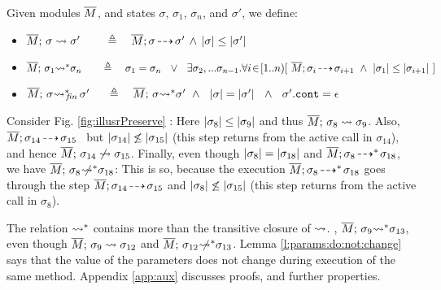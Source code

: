  
 \renewcommand{\EarlierS}[2]{\DepthSt{#1} \leq \DepthSt{#2}}
 \renewcommand{\NotEarlierS}[2]{\DepthSt{#1} \not\leq \DepthSt{#2}} 
 
\begin{definition} Given modules $\overline{M}$, and states $\sigma$, $\sigma_1$, $\sigma_n$, and $\sigma'$, we define:
\label{def:shallow:term}
 
\begin{itemize}

  \item
{  $\leadstoBounded  {\Mtwo} {\sigma}   {\sigma'} \ \ \   \,   \ \ \ \triangleq \ \ \  \leadstoOrig {\Mtwo} {\sigma} {\sigma'} \, \wedge\, 
 \EarlierS {\sigma}  {\sigma'} $}
  \item
{  $\leadstoBoundedStar {\Mtwo}  {\sigma_1}  {\sigma_n}  \ \ \,  \ \    \ \triangleq  \ \ \  {\sigma_1} = {\sigma_n}\ \ \vee \ \  \exists \sigma_2,...\sigma_{n-1}.\forall i\!\in\! [1..n)[\  \leadstoOrig {\Mtwo}  {\sigma_i}  {\sigma_{i+1}}\  \wedge\  \EarlierS{\sigma_1} {\sigma_{i+1}} \ ]$ }
\item
  $\leadstoBoundedStarFin {\Mtwo}  {\sigma}  {\sigma'}  \  \,  \ \  \ \triangleq  \ \ \  \leadstoBoundedStar {\Mtwo}  {\sigma}  {\sigma'}  \ \wedge\ \
 {\DepthFs \sigma = \DepthFs {\sigma'} \ \ \wedge \ \ \sigma'.\prg{cont}=\epsilon  } $
 \end{itemize}
\end{definition}


Consider    Fig. \ref{fig:illusrPreserve} :
Here $\EarlierS {\sigma_8} {\sigma_9}$
and thus $\overline{M};\, {\sigma_8} \rightsquigarrow \sigma_9$.
Also,  $\overline{M};\sigma_{14}\! \dashrightarrow\! {\sigma_{15}}$  \
  but  $\NotEarlierS {\sigma_{14}} {\sigma_{15}} $
  (this step returns from the active call in $\sigma_{14}$),
  and hence   $\overline{M};\, {\sigma_{14}} \not\rightsquigarrow \sigma_{15}$. 
Finally, even though $|\sigma_8| = |\sigma_{18}|$
 and $\overline{M};\sigma_8\! \dashrightarrow^*\! {\sigma_{18}}$, we have  
 $\overline{M};\, {\sigma_8} \not\!\!\!{\rightsquigarrow^*} \sigma_{18}$:
This is so, because the execution $\overline{M};\sigma_8\! \dashrightarrow^*\! {\sigma_{18}}$ goes through the step
$\overline{M};\sigma_{14}\! \dashrightarrow\! {\sigma_{15}}$ and  $\NotEarlierS {\sigma_{8}} {\sigma_{15}} $
 (this step returns from the active call in  $\sigma_8$).

\vspace{.1cm}
{The relation ${\rightsquigarrow^*}$ contains more than the transitive closure of  $\rightsquigarrow$.
\Eg, ${\overline{M};\, {\sigma_9} {\rightsquigarrow^*} \sigma_{13}}$, even though ${\overline{M};\, {\sigma_{9}} \rightsquigarrow \sigma_{12}}$  and ${\overline{M};\, {\sigma_{12}} \not\!\!\!{\rightsquigarrow^*} \sigma_{13}}$.} 
%
Lemma \ref{l:params:do:not:change} says that the value of the parameters does not change during  execution of the same method. 
Appendix \ref{app:aux} discusses proofs, and further properties.%
 

